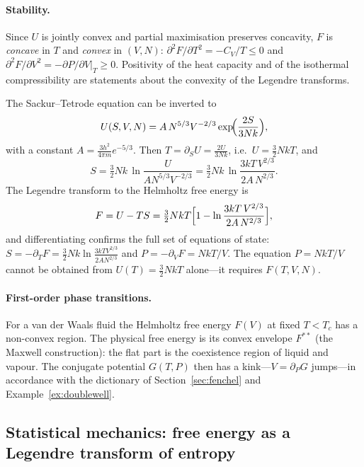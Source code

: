 \paragraph{Stability.}
Since $U$ is jointly convex and partial maximisation preserves concavity,
$F$ is \emph{concave} in $T$ and \emph{convex} in $(V,N)$:
$\partial^2F/\partial T^2=-C_V/T\le0$ and
$\partial^2F/\partial V^2=-\partial P/\partial V|_T\ge0$.  Positivity of the heat
capacity and of the isothermal compressibility are statements about
the convexity of the Legendre transforms.

\begin{example}
The Sackur--Tetrode equation can be inverted to
\[
  U(S,V,N)=A\,N^{5/3}V^{-2/3}\exp\!\Bigl(\frac{2S}{3Nk}\Bigr),
\]
with a constant $A=\tfrac{3h^2}{4\pi m}e^{-5/3}$.  Then
$T=\partial_SU=\frac{2U}{3Nk}$, i.e.\ $U=\tfrac32NkT$, and
\[
  S=\tfrac32Nk\,\ln\frac{U}{AN^{5/3}V^{-2/3}}
   =\tfrac32Nk\,\ln\frac{3kT\,V^{2/3}}{2A\,N^{2/3}} .
\]
The Legendre transform to the Helmholtz free energy is
\[
  F=U-TS=\tfrac32NkT\Bigl[1-\ln\frac{3kT\,V^{2/3}}{2A\,N^{2/3}}\Bigr],
\]
and differentiating confirms the full set of equations of state:
$S=-\partial_TF=\tfrac32Nk\ln\frac{3kTV^{2/3}}{2AN^{2/3}}$ and
$P=-\partial_VF=NkT/V$.  The equation $P=NkT/V$ cannot be obtained from
$U(T)=\tfrac32NkT$ alone---it requires $F(T,V,N)$.
\end{example}

\paragraph{First-order phase transitions.}
For a van der Waals fluid the Helmholtz free energy $F(V)$ at fixed $T<T_c$
has a non-convex region.  The physical free energy is its convex envelope
$F^{**}$ (the Maxwell construction): the flat part is the coexistence region
of liquid and vapour.  The conjugate potential $G(T,P)$ then has a
kink---$V=\partial_PG$ jumps---in accordance with the dictionary of
Section~\ref{sec:fenchel} and Example~\ref{ex:doublewell}.

\subsection{Statistical mechanics: free energy as a Legendre transform of entropy}

